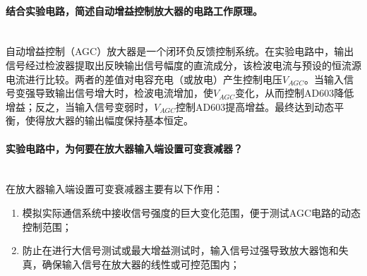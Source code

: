 \documentclass[12pt]{article}
\begin{document}
\paragraph{结合实验电路，简述自动增益控制放大器的电路工作原理。}~\\
自动增益控制（AGC）放大器是一个闭环负反馈控制系统。在实验电路中，输出信号经过检波器提取出反映输出信号幅度的直流成分，该检波电流与预设的恒流源电流进行比较。两者的差值对电容充电（或放电）产生控制电压$V_{AGC}$。当输入信号变强导致输出信号增大时，检波电流增加，使$V_{AGC}$变化，从而控制AD603降低增益；反之，当输入信号变弱时，$V_{AGC}$控制AD603提高增益。最终达到动态平衡，使得放大器的输出幅度保持基本恒定。
\paragraph{实验电路中，为何要在放大器输入端设置可变衰减器？}~\\
在放大器输入端设置可变衰减器主要有以下作用：
\begin{enumerate}
	\item 模拟实际通信系统中接收信号强度的巨大变化范围，便于测试AGC电路的动态控制范围；
	\item 防止在进行大信号测试或最大增益测试时，输入信号过强导致放大器饱和失真，确保输入信号在放大器的线性或可控范围内；
\end{enumerate}
\end{document}
